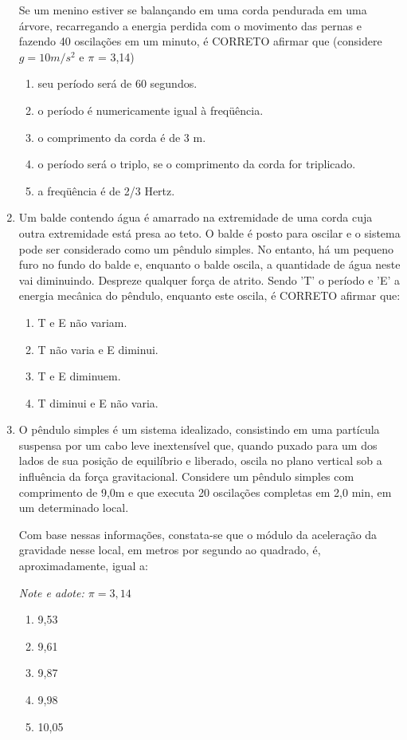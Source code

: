 \documentclass[12pt,letterpaper,fleqn]{article}
\begin{document}
\begin{enumerate}
Se um menino estiver se balançando em uma corda pendurada em uma árvore, recarregando a energia perdida com o movimento das pernas e fazendo 40 oscilações em um minuto, é CORRETO afirmar que (considere $g = 10 m/s^2$ e $\pi$ = 3,14)
\begin{enumerate}
    \item   seu período será de 60 segundos.
    \item o período é numericamente igual à freqüência.
    \item o comprimento da corda é de 3 m.
    \item o período será o triplo, se o comprimento da corda for triplicado.
    \item a freqüência é de 2/3 Hertz.
\end{enumerate}
\item Um balde contendo água é amarrado na extremidade de uma corda cuja outra extremidade está presa ao teto. O balde é posto para oscilar e o sistema pode ser considerado como um pêndulo simples. No entanto, há um pequeno furo no fundo do balde e, enquanto o balde oscila, a quantidade de água neste vai diminuindo. Despreze qualquer força de atrito. Sendo 'T' o período e 'E' a energia mecânica do pêndulo, enquanto este oscila, é CORRETO afirmar que:

\begin{enumerate}
    \item T e E não variam.
    \item T não varia e E diminui.
    \item T e E diminuem.
    \item T diminui e E não varia.
\end{enumerate}

\item O pêndulo simples é um sistema idealizado, consistindo em uma partícula suspensa por um cabo leve inextensível que, quando puxado para um dos lados de sua posição de equilíbrio e liberado, oscila no plano vertical sob a influência da força gravitacional. Considere um pêndulo simples com comprimento de 9,0m e que executa 20 oscilações completas em 2,0 min, em um determinado local.

Com base nessas informações, constata-se que o módulo da aceleração da gravidade nesse local, em metros por segundo ao quadrado, é, aproximadamente, igual a:

\textit{Note e adote: $\pi =3,14$}
\begin{enumerate}
    \item 9,53
    \item 9,61
    \item 9,87
    \item 9,98
    \item 10,05
\end{enumerate}


\end{enumerate}
\end{document}
